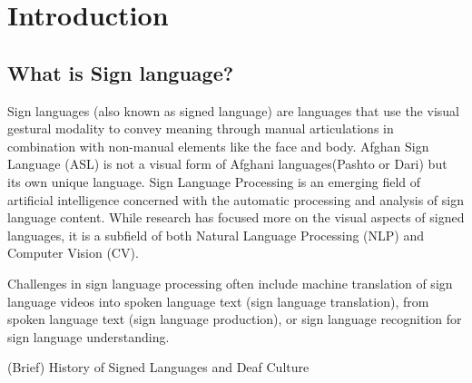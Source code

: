 \chapter[Introduction]{Introduction}
\label{Chap:Intro}

\makeatletter
\setlength{\@fptop}{0pt} %
\makeatother


\section{What is Sign language?}
Sign languages (also known as signed language) are languages that use the visual gestural modality to convey meaning through manual articulations in combination with
non-manual elements like the face and body. Afghan Sign Language (ASL)
is not a visual form of Afghani languages(Pashto or Dari) but its own unique language.
Sign Language Processing is an emerging field of
artificial intelligence concerned with the automatic processing and analysis of sign
language content. While research has focused more on the visual aspects of signed
languages, it is a subfield of both Natural Language Processing (NLP) and Computer
Vision (CV).

Challenges in sign language processing often include machine translation of
sign language videos into spoken language text (sign language translation), from spoken
language text (sign language production), or sign language recognition for sign language
understanding.



(Brief) History of Signed Languages and Deaf Culture

